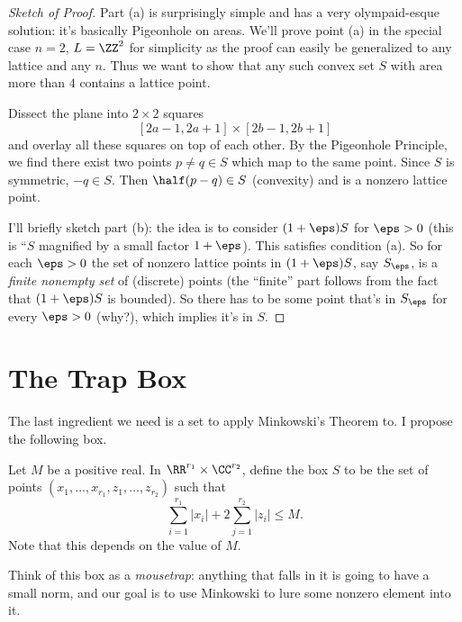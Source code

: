 \begin{proof}[Sketch of Proof]
	Part (a) is surprisingly simple and has a very olympaid-esque solution: it's basically Pigeonhole on areas.
	We'll prove point (a) in the special case $n=2$, $L = \ZZ^2$ for simplicity as the proof
	can easily be generalized to any lattice and any $n$.
	Thus we want to show that any such convex set $S$ with area more than $4$ contains a lattice point.

	Dissect the plane into $2 \times 2$ squares 
	\[ [2a-1, 2a+1] \times [2b-1, 2b+1] \]
	and overlay all these squares on top of each other.
	By the Pigeonhole Principle, we find there exist two points $p \neq q \in S$ which map to the same point.
	Since $S$ is symmetric, $-q \in S$. Then $\half (p-q) \in S$ (convexity) and is a nonzero lattice point.

	I'll briefly sketch part (b): the idea is to consider $(1+\eps) S$ for $\eps > 0$
	(this is ``$S$ magnified by a small factor $1+\eps$).
	This satisfies condition (a). So for each $\eps > 0$ the set of nonzero lattice points in $(1+\eps) S$,
	say $S_\eps$, is a \emph{finite nonempty set} of (discrete) points
	(the ``finite'' part follows from the fact that $(1+\eps)S$ is bounded).
	So there has to be some point that's in $S_\eps$ for every $\eps > 0$ (why?), which implies it's in $S$.
\end{proof}

\section{The Trap Box}
The last ingredient we need is a set to apply Minkowski's Theorem to.
I propose the following box.
\begin{definition}
	Let $M$ be a positive real.
	In $\RR^{r_1} \times \CC^{r_2}$, define the box $S$ to be the
	set of points $(x_1, \dots, x_{r_1}, z_1, \dots, z_{r_2})$ such that
	\[
		\sum_{i=1}^{r_1} \left\lvert x_i \right\rvert
		+ 2 \sum_{j=1}^{r_2} \left\lvert z_i \right\rvert
		\le M. 
	\]
	Note that this depends on the value of $M$.
\end{definition}

Think of this box as a \emph{mousetrap}: anything that falls in it is going to have a small norm,
and our goal is to use Minkowski to lure some nonzero element into it.

